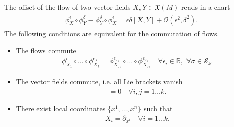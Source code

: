 \documentclass[../geometry_main.tex]{subfiles}
\begin{document}
\begin{mytheorem}
The offset of the flow of two vector fields $X,Y \in \mathfrak{X}(M)$ reads in a chart
\begin{align}
\begin{aligned}
    \phi_{X}^{\epsilon} \circ \phi_{Y}^{\delta} - \phi_{Y}^{\delta} \circ \phi_{X}^{\epsilon}= \epsilon \delta [X,Y] + \mathcal{O}(\epsilon^2, \delta^2).
\end{aligned}
\end{align}
The following conditions are equivalent for the commutation of flows.
\begin{itemize}
    \item The flows commute
        \begin{align}
            \phi_{X_1}^{\epsilon_1}\circ\dots\circ \phi_{X_k}^{\epsilon_k} = \phi_{X_{\sigma_1}}^{\epsilon_{\sigma_1}}\circ\dots\circ \phi_{X_{\sigma_k}}^{\epsilon_{\sigma_k}} \quad \forall \epsilon_i \in \mathbb{R},\,\, \forall \sigma \in \mathcal{S}_k.
        \end{align}
    \item The vector fields commute, i.e. all Lie brackets vanish
        \begin{align}
            [X_i, X_j] = 0 \quad \forall i,j=1\dots k.
        \end{align} 
    \item There exist local coordinates $\{x^1, \dots, x^n\}$ such that
        \begin{align}
            X_i = \partial_{x^i} \quad \forall i=1\dots k.
        \end{align}
\end{itemize}
\end{mytheorem}
\end{document}
